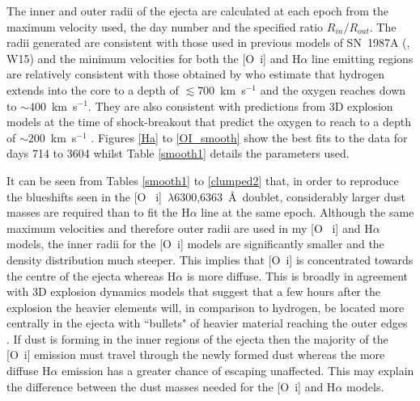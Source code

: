 The inner and outer radii of the ejecta are calculated at each epoch from 
the maximum velocity used, the day number and the specified ratio 
$R_{in}/R_{out}$.  The radii generated are consistent with those used in 
previous models of SN~1987A (\citet{Ercolano2007}, W15) and the 
minimum velocities for both the [O~{\sc i}] and H$\alpha$ line emitting 
regions are relatively consistent with those obtained by \citet{Kozma1998b} 
who estimate that  hydrogen extends into the core to a depth of 
$\lesssim 700$~km~s$^{-1}$ and the oxygen reaches down to $\sim 
400$~km~s$^{-1}$.  They are also consistent with predictions from 3D 
explosion models at the time of shock-breakout that predict the oxygen to 
reach to a depth of $\sim 200$~km~s$^{-1}$ 
\citep{Hammer2010,Wongwathanarat2015}. Figures \ref{Ha} to 
\ref{OI_smooth} show the best fits to the data for days 714 to 3604 
whilst Table \ref{smooth1} details the parameters used.


It can be seen from Tables \ref{smooth1} to \ref{clumped2} that, in order 
to reproduce the blueshifts seen in the [O~{\sc 
i}]~$\lambda$6300,6363~\AA\ doublet, considerably larger dust masses are 
required than to fit the H$\alpha$ line at the same epoch.  Although the 
same maximum velocities and therefore outer radii are used in my [O~{\sc 
i}] and H$\alpha$ models, the inner radii for the [O~{\sc i}] models are 
significantly smaller and the density distribution much steeper.  This 
implies that [O~{\sc i}] is concentrated towards the centre of the 
ejecta whereas H$\alpha$ is more diffuse.  This is broadly in 
agreement with 3D explosion dynamics models that suggest that a few hours 
after the explosion the heavier elements will, in comparison to hydrogen, 
be located more centrally in the ejecta with ``bullets" of heavier 
material reaching the outer edges \citep{Hammer2010}.  If dust is forming 
in the inner regions of the ejecta then the majority of the [O~{\sc i}] 
emission must travel through the newly formed dust whereas the more 
diffuse H$\alpha$ emission has a greater chance of escaping unaffected.  
This may explain the difference between the dust masses needed for the 
[O~{\sc i}] and H$\alpha$ models.

